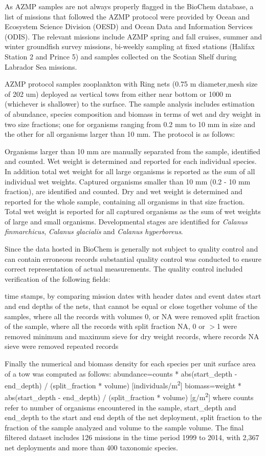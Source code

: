 \documentclass[letterpaper,portrait,11pt]{scrartcl}
\numberwithin{equation}{section}		%
\numberwithin{figure}{section}			%
\numberwithin{table}{section}				%
\begin{document}
\begin{appendices}
As AZMP samples are not always properly flagged in the BioChem database, a list of missions that followed the AZMP protocol were provided by Ocean and Ecosystem Science Division (OESD) and Ocean Data and Information Services (ODIS). The relevant missions include AZMP spring and fall cruises, summer and winter groundfish survey missions, bi-weekly sampling at fixed stations (Halifax Station 2 and Prince 5) and samples collected on the Scotian Shelf during Labrador Sea missions. 

AZMP protocol samples zooplankton with Ring nets (0.75 m diameter,mesh size of 202 um) deployed as vertical tows from either near bottom or 1000 m (whichever is shallower) to the surface. The sample analysis includes estimation of abundance, species composition and biomass in terms of wet and dry weight in two size fractions; one for organisms ranging from 0.2 mm to 10 mm in size and the other for all organisms larger than 10 mm.  The protocol is as follows:

	Organisms larger than 10 mm are manually separated from the sample, identified and counted. Wet weight is determined and reported for each individual species. In addition total wet weight for all large organisms is reported as the sum of all individual wet weights.
	Captured organisms smaller than 10 mm (0.2 - 10 mm fraction), are identified and counted. Dry and wet weight is determined and reported for the whole sample, containing all organisms in that size fraction.
	Total wet weight is reported for all captured organisms as the sum of wet weights of large and small organisms. 
	Developmental stages are identified for \textit{Calanus finmarchicus}, \textit{Calanus glacialis} and \textit{Calanus hyperboreus}.

Since the data hosted in BioChem is generally not subject to quality control and can contain erroneous records substantial quality control was conducted to ensure correct representation of actual measurements. The quality control included verification of the following fields: 

	time stamps, by comparing mission dates with header dates and event dates 
	start and end depths of the nets, that cannot be equal or close together
	volume of the samples, where all the records with volumes 0, or NA were removed
	split fraction of the sample, where all the records with split fraction NA, 0 or $>$1 were removed 
	minimum and maximum sieve for dry weight records, where records NA sieve were removed
	repeated records 

Finally the numerical and biomass density for each species per unit surface area of a tow was computed as follows: 
abundance=counts * abs(start\_depth - end\_depth) / (split\_fraction * volume)   [individuals/m\textsuperscript{2}]
biomass=weight * abs(start\_depth - end\_depth) / (split\_fraction * volume)         [g/m\textsuperscript{2}]
where counts refer to number of organisms encountered in the sample, start\_depth and end\_depth to the start and end depth of the net deployment, split fraction to the fraction of the sample analyzed and volume to the sample volume.
The final filtered dataset includes 126 missions in the time period 1999 to 2014, with 2,367 net deployments and more than 400 taxonomic species. 

\end{appendices}
\end{document}
